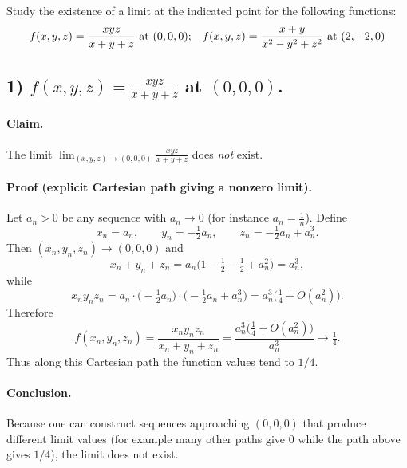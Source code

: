 \documentclass[12pt]{article}
\begin{document}
\section{}
Study the existence of a limit at the indicated point for the following functions:
\[
\begin{array}{ll}
\displaystyle f(x, y, z) = \dfrac{xyz}{x + y + z}$ at $(0, 0, 0); &
\displaystyle f(x, y, z) = \dfrac{x + y}{x^2 - y^2 + z^2}$ at $(2, -2, 0) 
\end{array}
\]

\begin{correctionbox}
\subsection*{1) \(\displaystyle f(x,y,z)=\frac{xyz}{x+y+z}\) at \((0,0,0)\).}

\paragraph{Claim.} The limit \(\displaystyle\lim_{(x,y,z)\to(0,0,0)}\frac{xyz}{x+y+z}\) does \emph{not} exist.

\paragraph{Proof (explicit Cartesian path giving a nonzero limit).}
Let \(a_n>0\) be any sequence with \(a_n\to0\) (for instance \(a_n=\tfrac{1}{n}\)). Define
\[
x_n=a_n,\qquad y_n=-\tfrac{1}{2}a_n,\qquad z_n=-\tfrac{1}{2}a_n + a_n^3.
\]
Then \((x_n,y_n,z_n)\to(0,0,0)\) and
\[
x_n+y_n+z_n
= a_n\Big(1-\tfrac12-\tfrac12 + a_n^2\Big)=a_n^3,
\]
while
\[
x_n y_n z_n
= a_n\cdot\Big(-\tfrac12 a_n\Big)\cdot\Big(-\tfrac12 a_n + a_n^3\Big)
= a_n^3\Big(\tfrac14 + O(a_n^2)\Big).
\]
Therefore
\[
f(x_n,y_n,z_n)
=\frac{x_n y_n z_n}{x_n+y_n+z_n}
=\frac{a_n^3\big(\tfrac14 + O(a_n^2)\big)}{a_n^3}
\longrightarrow \tfrac14.
\]
Thus along this Cartesian path the function values tend to \(1/4\).

\paragraph{Conclusion.} Because one can construct sequences approaching \((0,0,0)\) that produce different limit values (for example many other paths give \(0\) while the path above gives \(1/4\)), the limit does not exist.

\bigskip


\end{correctionbox}
\end{document}
